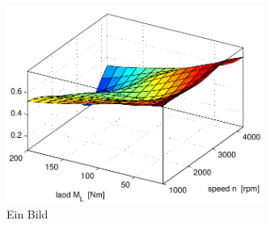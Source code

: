 \begin{figure}
   \centering
   \includegraphics[width=0.75\textwidth]{images/k_surf.pdf}
   \caption{Ein Bild}
   \label{pics:k_surf}
\end{figure}

